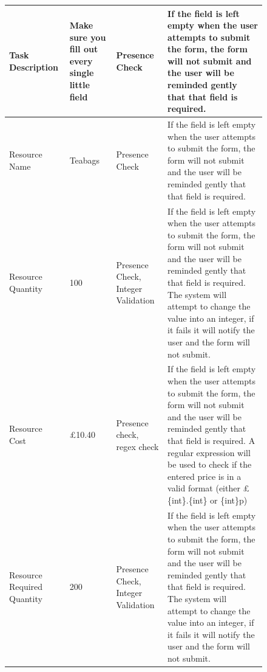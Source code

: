 \begin{figure}
\begin{table}[width=\textwidth]
\begin{tabular}{llll}
\multicolumn{1}{|l|}{Task Description}           & \multicolumn{1}{l|}{Make sure you fill out every single little field} & \multicolumn{1}{l|}{Presence Check}                                          & \multicolumn{1}{l|}{If the field is left empty when the user attempts to submit the form, the form will not submit and the user will be reminded gently that that field is required.}                                                                                                                            \\ \hline
\multicolumn{1}{|l|}{Resource Name}              & \multicolumn{1}{l|}{Teabags}                                          & \multicolumn{1}{l|}{Presence Check}                                          & \multicolumn{1}{l|}{If the field is left empty when the user attempts to submit the form, the form will not submit and the user will be reminded gently that that field is required.}                                                                                                                            \\ \hline
Resource Quantity                                & 100                                                                   & Presence Check, Integer Validation                                           & If the field is left empty when the user attempts to submit the form, the form will not submit and the user will be reminded gently that that field is required. The system will attempt to change the value into an integer, if it fails it will notify the user and the form will not submit.                  \\
Resource Cost                                    & £10.40                                                                & Presence check, regex check                                                  & If the field is left empty when the user attempts to submit the form, the form will not submit and the user will be reminded gently that that field is required. A regular expression will be used to check if the entered price is in a valid format (either  £\{int\}.\{int\} or \{int\}p)                     \\
Resource Required Quantity                       & 200                                                                   & Presence Check, Integer Validation                                           & If the field is left empty when the user attempts to submit the form, the form will not submit and the user will be reminded gently that that field is required. The system will attempt to change the value into an integer, if it fails it will notify the user and the form will not submit.                  \\

\end{tabular}
\end{table}
\end{figure}
